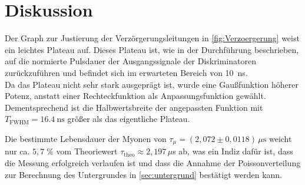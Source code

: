 \newpage
\section{Diskussion}
    Der Graph zur Justierung der Verzörgerungsleitungen in \autoref{fig:Verzoergerung} weist ein leichtes Plateau auf.
    Dieses Plateau ist, wie in der Durchführung beschrieben, auf die normierte Pulsdauer der Ausgangssignale der Diskriminatoren zurückzuführen und befindet sich im erwarteten Bereich von \SI{10}{\nano \second}. \\
    Da das Plateau nicht sehr stark ausgeprägt ist, wurde eine Gaußfunktion höherer Potenz, anstatt einer Rechteckfunktion als Anpassungsfunktion gewählt.
    Dementsprechend ist die Halbwertsbreite der angepassten Funktion mit $T_{\text{FWHM}} = \SI{16,4}{\nano \second}$ größer als das eigentliche Plateau.

    Die bestimmte Lebensdauer der Myonen von $\tau_{\mu} = (2,072 \pm 0,0118) \, \mu\text{s}$ weicht nur ca. $5,7 \;\%$ vom Theoriewert $\tau_{\text{theo}} \approx 2,197 \, \mu$s \cite{zyla_review_2020} ab, was ein Indiz dafür ist, dass die Messung erfolgreich verlaufen ist und dass die Annahme der Poissonverteilung zur Berechnung des Untergrundes in \autoref{sec:untergrund} bestätigt werden kann.

    


